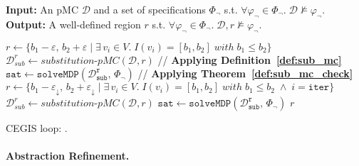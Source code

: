 \begin{algorithm}[h!]
\hspace*{\algorithmicindent} \textbf{Input:} An pMC $\mathcal{D}$ and a set of specifications $\varPhi_{\neg}$ s.t. $\forall \varphi_{\neg} \in \varPhi_{\neg}. \; \mathcal{D} \not\models \varphi_{\neg}$. \\
\hspace*{\algorithmicindent} \textbf{Output:} A well-defined region $r$ s.t. $\forall \varphi_{\neg} \in \varPhi_{\neg}. \; \mathcal{D}, r \not\models \varphi_{\neg}. $ \\
\vspace*{-1.5em}
\begin{algorithmic}[1]
    \STATE $r \leftarrow \{ b_1 - \varepsilon, \, b_2 + \varepsilon \; \lvert \; \exists \, v_i \in V. \; I(v_i) = [b_1, b_2] \; with \; b_1 \leq b_2\}$
    \STATE $\mathcal{D}_{sub}^r \leftarrow \textit{substitution-pMC}(\mathcal{D}, r) $ \hfill // \textbf{Applying Definition~\ref{def:sub_mc}}
    \STATE $\mathtt{sat} \leftarrow \mathtt{solveMDP(\mathcal{D}_{sub}^r, \, \varPhi_{\neg})}$ \hfill // \textbf{Applying Theorem~\ref{def:sub_mc_check}}
        \STATE $r \leftarrow \{ b_1 - \varepsilon_{\downarrow}, \, b_2 + \varepsilon_{\downarrow} \; \lvert \; \exists \, v_i \in V. \; I(v_i) = [b_1, b_2] \; with \; b_1 \leq b_2 \; \land \; i = \texttt{iter} \}$
        \STATE $\mathcal{D}_{sub}^r \leftarrow \textit{substitution-pMC}(\mathcal{D}, r) $
    \STATE $\mathtt{sat} \leftarrow \mathtt{solveMDP(\mathcal{D}_{sub}^r, \, \varPhi_{\neg})}$
    \ENDWHILE
    \RETURN $r$
\end{algorithmic}
\caption{CEGIS loop: .}
\label{alg:cegis_ce_combined}
\end{algorithm}

\paragraph{Abstraction Refinement.}
